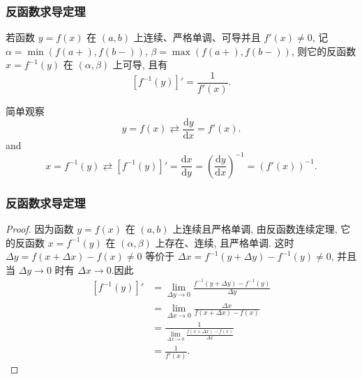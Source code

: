 \documentclass[
10pt,
aspectratio=43,
]{beamer}
\begin{document}
\begin{frame}
	\frametitle{反函数求导定理}
	\begin{theorem}[反函数求导定理]
		若函数 $y=f(x)$ 在 $(a, b)$ 上连续、严格单调、可导并且 $f'(x) \neq 0$, 记 $\alpha=\min(f(a+), f(b-))$, $\beta=\max(f(a+), f(b-))$, 则它的反函数 $x=f^{-1}(y)$ 在 $(\alpha, \beta)$ 上可导, 且有
		\[
			\left[f^{-1}(y)\right]' = \frac{1}{f'(x)}.
		\]
	\end{theorem}
	\begin{exampleblock}{简单观察}
		\begin{equation*}
			y=f(x)\rightleftarrows\frac{\mathrm{d}y}{\mathrm{d}x}=f'(x).
		\end{equation*}
		and
		\begin{equation*}
			x=f^{-1}(y)\rightleftarrows\left[f^{-1}(y)\right]'=\frac{\mathrm{d}x}{\mathrm{d}y}=\left(\frac{\mathrm{d}y}{\mathrm{d}x}\right)^{-1}=(f'(x))^{-1}.
		\end{equation*}

	\end{exampleblock}
\end{frame}

\begin{frame}
	\frametitle{反函数求导定理}
	\begin{proof}
		因为函数 $y=f(x)$ 在 $(a, b)$ 上连续且严格单调, 由反函数连续定理, 它的反函数 $x=f^{-1}(y)$ 在 $(\alpha, \beta)$ 上存在、连续, 且严格单调. 这时 $\Delta y=f(x+\Delta x)-f(x) \neq 0$ 等价于 $\Delta x=f^{-1}(y+\Delta y)-f^{-1}(y) \neq 0$, 并且当 $\Delta y \rightarrow 0$ 时有 $\Delta x \rightarrow 0$.因此
		\[
			\begin{aligned}
				\left[f^{-1}(y)\right]' & = \lim_{\Delta y \rightarrow 0} \frac{f^{-1}(y+\Delta y)-f^{-1}(y)}{\Delta y} \\
				                        & = \lim_{\Delta x \rightarrow 0} \frac{\Delta x}{f(x+\Delta x)-f(x)}           \\
				                        & = \frac{1}{\lim_{\Delta x \rightarrow 0} \frac{f(x+\Delta x)-f(x)}{\Delta x}} \\
				                        & = \frac{1}{f'(x)}.
			\end{aligned}
		\]
	\end{proof}
\end{frame}
\end{document}
